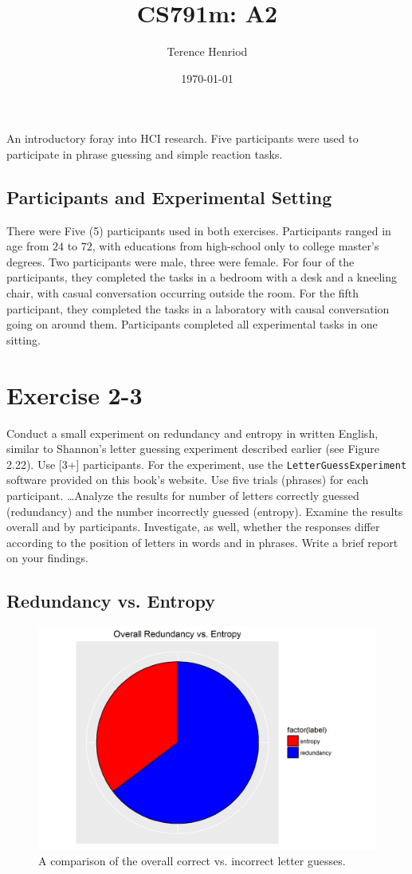 \documentclass{article}
\title{CS791m: A2}
\author{Terence Henriod}
\date{\today}
\begin{document}
\maketitle

An introductory foray into HCI research. Five participants were used to participate in phrase guessing and simple reaction tasks.

\newpage
\subsection{Participants and Experimental Setting}
There were Five (5) participants used in both exercises. Participants ranged in age from $24$ to $72$, with educations from high-school only to college master's degrees. Two participants were male, three were female. For four of the participants, they completed the tasks in a bedroom with a desk and a kneeling chair, with casual conversation occurring outside the room. For the fifth participant, they completed the tasks in a laboratory with causal conversation going on around them. Participants completed all experimental tasks in one sitting.

%
\section{Exercise 2-3}
Conduct a small experiment on redundancy and entropy in written English, similar to Shannon's letter guessing experiment described earlier (see Figure 2.22). Use [3+] participants. For the experiment, use the \texttt{LetterGuessExperiment} software provided on this book's website. Use five trials (phrases) for each participant. \dots Analyze the results for number of letters correctly guessed (redundancy) and the number incorrectly guessed (entropy). Examine the results overall and by participants. Investigate, as well, whether the responses differ according to the position of letters in words and in phrases. Write a brief report on your findings.

%
\subsection{Redundancy vs. Entropy}
\begin{figure}[h!]
\centering
\includegraphics[width=.5\linewidth]{overall-redundancy-entropy}
\caption{A comparison of the overall correct vs. incorrect letter guesses.}
\label{fig:overall-redundancy-entropy}
\end{figure}
\end{document}

